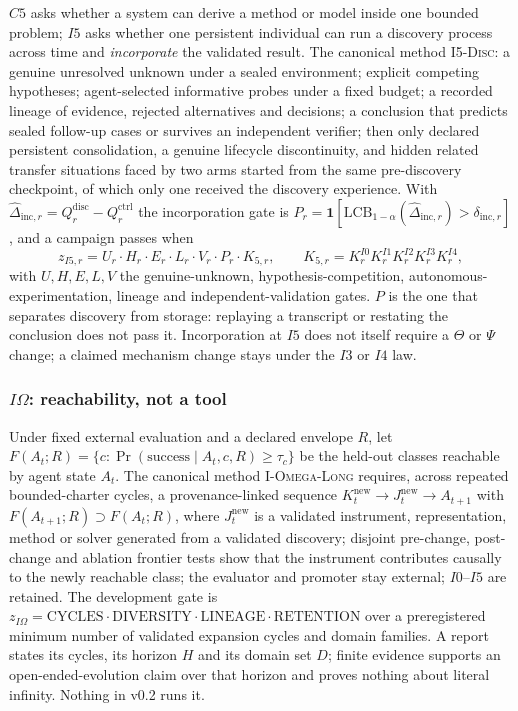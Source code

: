 \documentclass[11pt]{article}
\theoremstyle{definition}
\begin{document}
$C5$ asks whether a system can derive a method or model inside one bounded problem; $I5$ asks whether one persistent individual can run a discovery process across time and \emph{incorporate} the validated result. The canonical method \textsc{I5-Disc}: a genuine unresolved unknown under a sealed environment; explicit competing hypotheses; agent-selected informative probes under a fixed budget; a recorded lineage of evidence, rejected alternatives and decisions; a conclusion that predicts sealed follow-up cases or survives an independent verifier; then only declared persistent consolidation, a genuine lifecycle discontinuity, and hidden related transfer situations faced by two arms started from the same pre-discovery checkpoint, of which only one received the discovery experience. With $\hat\Delta_{\mathrm{inc},r} = Q^{\mathrm{disc}}_r - Q^{\mathrm{ctrl}}_r$ the incorporation gate is $P_r = \mathbf 1[\mathrm{LCB}_{1-\alpha}(\hat\Delta_{\mathrm{inc},r}) > \delta_{\mathrm{inc},r}]$, and a campaign passes when
\[
z_{I5,r} = U_r \cdot H_r \cdot E_r \cdot L_r \cdot V_r \cdot P_r \cdot K_{5,r}, \qquad K_{5,r} = K^{I0}_r K^{I1}_r K^{I2}_r K^{I3}_r K^{I4}_r,
\]
with $U, H, E, L, V$ the genuine-unknown, hypothesis-competition, autonomous-experimentation, lineage and independent-validation gates. $P$ is the one that separates discovery from storage: replaying a transcript or restating the conclusion does not pass it. Incorporation at $I5$ does not itself require a $\Theta$ or $\Psi$ change; a claimed mechanism change stays under the $I3$ or $I4$ law.

\subsubsection{$I\Omega$: reachability, not a tool}\label{sec:iomega}

Under fixed external evaluation and a declared envelope $R$, let $F(A_t; R) = \{c : \Pr(\text{success} \mid A_t, c, R) \ge \tau_c\}$ be the held-out classes reachable by agent state $A_t$. The canonical method \textsc{I-Omega-Long} requires, across repeated bounded-charter cycles, a provenance-linked sequence $K^{\mathrm{new}}_t \to J^{\mathrm{new}}_t \to A_{t+1}$ with $F(A_{t+1}; R) \supset F(A_t; R)$, where $J^{\mathrm{new}}_t$ is a validated instrument, representation, method or solver generated from a validated discovery; disjoint pre-change, post-change and ablation frontier tests show that the instrument contributes causally to the newly reachable class; the evaluator and promoter stay external; $I0$--$I5$ are retained. The development gate is $z_{I\Omega} = \mathrm{CYCLES} \cdot \mathrm{DIVERSITY} \cdot \mathrm{LINEAGE} \cdot \mathrm{RETENTION}$ over a preregistered minimum number of validated expansion cycles and domain families. A report states its cycles, its horizon $H$ and its domain set $D$; finite evidence supports an open-ended-evolution claim over that horizon and proves nothing about literal infinity. Nothing in v0.2 runs it.
\end{document}
